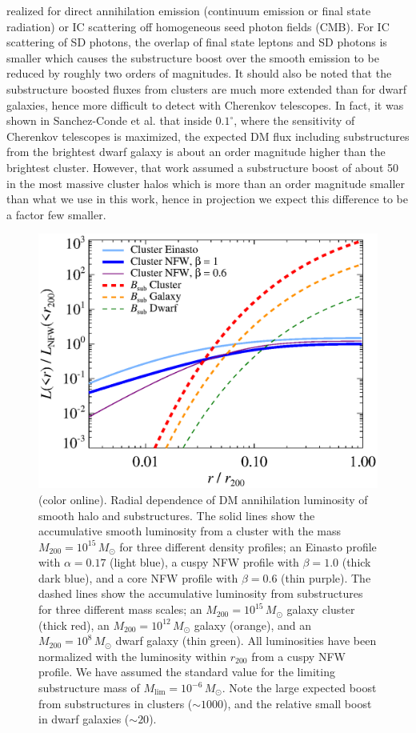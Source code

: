 \documentclass[10pt,aps,pra,reprint,amsmath,amsfonts,amssymb,showpacs,nofootinbib,floatfix]{revtex4-1}
\newcommand{\rmn}{\mathrm}
\newcommand{\msun}{M_\odot}
\newcommand{\degs}{^\circ}
\newcommand{\colo}{(color online). }
\newcommand{\rvir}{r_{200}}
\newcommand{\mvir}{M_{200}}
\begin{document}
realized for direct annihilation emission (continuum emission or final
state radiation) or IC scattering off homogeneous seed photon fields
(CMB). For IC scattering of SD photons, the overlap of final state
leptons and SD photons is smaller which causes the substructure boost
over the smooth emission to be reduced by roughly two orders of
magnitudes. It should also be noted that the substructure boosted
fluxes from clusters are much more extended than for dwarf galaxies,
hence more difficult to detect with Cherenkov telescopes. In fact, it
was shown in Sanchez-Conde et al. \cite{2011arXiv1104.3530S} that
inside $0.1\degs$, where the sensitivity of Cherenkov telescopes is
maximized, the expected DM flux including substructures from the
brightest dwarf galaxy is about an order magnitude higher than the
brightest cluster. However, that work assumed a substructure boost of
about 50 in the most massive cluster halos which is more than an order
magnitude smaller than what we use in this work, hence in projection
we expect this difference to be a factor few smaller.

\begin{figure}%
 \includegraphics[width=0.99\columnwidth]{figures/dens.prof.bw.eps}
 \caption{\colo Radial dependence of DM annihilation
   luminosity of smooth halo and substructures. The solid lines show
   the accumulative smooth luminosity from a cluster with the mass
   $\mvir=10^{15}\,\msun$ for three different density profiles; an
   Einasto profile with $\alpha=0.17$ (light blue), a cuspy NFW
   profile with $\beta=1.0$ (thick dark blue), and a core NFW profile
   with $\beta=0.6$ (thin purple). The dashed lines show the
   accumulative luminosity from substructures for three different mass
   scales; an $\mvir=10^{15}\,\msun$ galaxy cluster (thick red), an
   $\mvir=10^{12}\,\msun$ galaxy (orange), and an
   $\mvir=10^{8}\,\msun$ dwarf galaxy (thin green). All luminosities
   have been normalized with the luminosity within $\rvir$ from a
   cuspy NFW profile. We have assumed the standard value for the
   limiting substructure mass of $M_\rmn{lim}=10^{-6}\,\msun$. Note
   the large expected boost from substructures in clusters
   ($\sim1000$), and the relative small boost in dwarf galaxies
   ($\sim20$).}
 \label{fig:radial_lum}
\end{figure}
\end{document}
